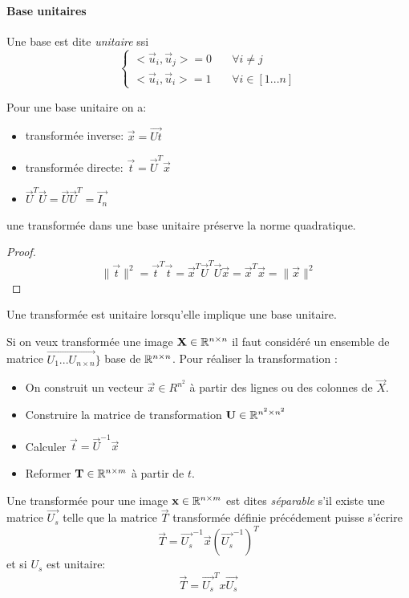 \documentclass[main.tex]{subfiles}
\begin{document}
\paragraph{Base unitaires}
\begin{defin}
  Une base est dite \emph{unitaire} ssi
  \[
    \begin{cases}
      <\vec{u}_i ,\vec{u}_j> = 0 &\quad\forall i \neq j\\
      <\vec{u}_i ,\vec{u}_i> = 1 &\quad\forall i \in [1 ... n]
    \end{cases}
  \]
\end{defin}
\begin{prop}
  Pour une base unitaire on a:
  \begin{itemize}
  \item transformée inverse: $\vec{x}=\vec{Ut}$
  \item transformée directe: $\vec{t} = \vec{U}^T\vec{x}$
  \item $\vec{U}^T\vec{U}= \vec{U}\vec{U}^T = \vec{I_n}$
  \end{itemize}

  une transformée dans une base unitaire préserve la norme quadratique.
\end{prop}
\begin{proof}
  \[
    \|\vec{t}\|^2 = \vec{t}^T\vec{t} = \vec{x}^T \vec{U}^T\vec{U}\vec{x} = \vec{x}^T\vec{x} =\|\vec{x}\|^2
  \]
\end{proof}

\begin{rem}
  Une transformée est unitaire lorsqu'elle implique une base unitaire.
\end{rem}

Si on veux transformée une image $\mathbf{X}\in \mathbb{R}^{n\times n}$ il faut considéré un ensemble de matrice $\vec{U_1 ... U_{n\times n}}\}$ base de $\mathbb{R}^{n\times n}$.
  Pour réaliser la transformation :
  \begin{itemize}
  \item On construit un vecteur $\vec{x} \in R^{n^2}$ à partir des lignes ou des
    colonnes de $\vec{X}$.
  \item  Construire la matrice de transformation $\mathbf{U}\in \mathbb{R}^{n^2\times n^2}$
  \item Calculer $\vec{t} = \vec{U}^{-1}\vec{x}$
  \item Reformer $\mathbf{T} \in \mathbb{R}^{n\times m}$ à partir de $t$.
  \end{itemize}

\begin{prop}
Une transformée pour une image $\mathbf{x}\in \mathbb{R}^{n\times m}$ est dites \emph{séparable} s'il existe une matrice $\vec{U_s}$ telle que la matrice $\vec{T}$ transformée définie précédement puisse s'écrire
\[
  \vec{T} = \vec{U_s}^{-1}\vec{x}(\vec{U_s}^{-1})^T
\]
et si $U_s$ est unitaire:
\[
  \vec{T} = \vec{U_s}^T x \vec{U_s}
\]
\end{prop}
\end{document}
